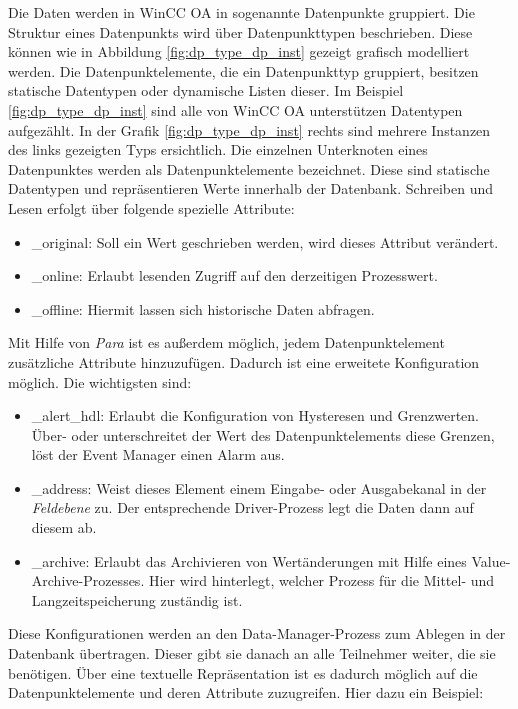 Die Daten werden in WinCC OA in sogenannte Datenpunkte gruppiert. Die Struktur eines Datenpunkts wird über Datenpunkttypen 
beschrieben. Diese können wie in Abbildung \ref{fig:dp_type_dp_inst} gezeigt grafisch modelliert werden. Die Datenpunktelemente,
die ein Datenpunkttyp gruppiert, besitzen statische Datentypen oder dynamische Listen dieser. 
Im Beispiel \ref{fig:dp_type_dp_inst} sind alle von WinCC OA unterstützen Datentypen aufgezählt.
In der Grafik \ref{fig:dp_type_dp_inst} rechts sind mehrere Instanzen des links gezeigten Typs ersichtlich.
Die einzelnen Unterknoten eines Datenpunktes werden als Datenpunktelemente bezeichnet. Diese sind statische
Datentypen und repräsentieren Werte innerhalb der Datenbank. Schreiben und Lesen erfolgt über folgende spezielle
Attribute:

\begin{itemize}
    \item \_original: Soll ein Wert geschrieben werden, wird dieses Attribut verändert.
    \item \_online: Erlaubt lesenden Zugriff auf den derzeitigen Prozesswert.  
    \item \_offline: Hiermit lassen sich historische Daten abfragen.\\
\end{itemize}

Mit Hilfe von \textit{Para} ist es außerdem möglich, jedem Datenpunktelement zusätzliche Attribute hinzuzufügen.
Dadurch ist eine erweitete Konfiguration möglich. Die wichtigsten sind:

\begin{itemize}
    \item \_alert\_hdl: Erlaubt die Konfiguration von Hysteresen und Grenzwerten. Über- oder unterschreitet der Wert des Datenpunktelements diese Grenzen, löst der Event Manager einen Alarm aus.
    \item \_address: Weist dieses Element einem Eingabe- oder Ausgabekanal in der \textit{Feldebene} zu. Der entsprechende Driver-Prozess legt die Daten dann auf diesem ab.  
    \item \_archive: Erlaubt das Archivieren von Wertänderungen mit Hilfe eines Value-Archive-Prozesses. Hier wird hinterlegt, welcher Prozess für die Mittel- und Langzeitspeicherung zuständig ist.\\
\end{itemize}

Diese Konfigurationen werden an den Data-Manager-Prozess zum Ablegen in der Datenbank übertragen. Dieser gibt sie danach an alle Teilnehmer weiter, die sie benötigen. Über eine textuelle Repräsentation
ist es dadurch möglich auf die Datenpunktelemente und deren Attribute zuzugreifen. Hier dazu ein Beispiel: \\

